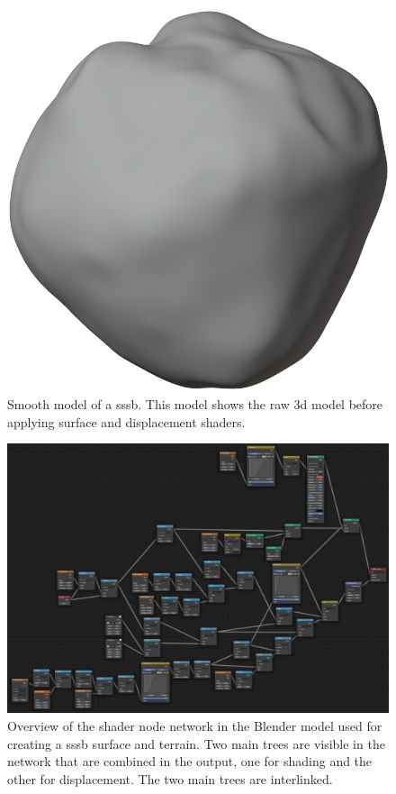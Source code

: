\begin{figure}[htb]
    \centering
    \includegraphics[width=.4\textwidth]{doc/thesis/0_figures/procedural_terrain/smooth_model.png}
    \caption{Smooth model of a \gls{sssb}. This model shows the raw \gls{3d} model before applying surface and displacement shaders.}
    \label{fig:smooth_model}
\end{figure}

\begin{figure}[htb]
    \centering
    \includegraphics[width=\textwidth]{doc/thesis/0_figures/procedural_terrain/node_network.png}
    \caption{Overview of the shader node network in the Blender model used for creating a \gls{sssb} surface and terrain. Two main trees are visible in the network that are combined in the output, one for shading and the other for displacement. The two main trees are interlinked.}
    \label{fig:shader_nodes}
\end{figure}

